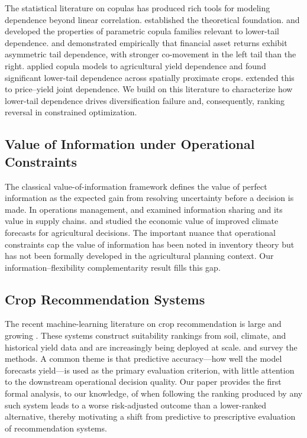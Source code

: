 \documentclass[12pt,review,authoryear]{elsarticle}
\numberwithin{equation}{section}
\begin{document}
The statistical literature on copulas has produced rich tools for modeling
dependence beyond linear correlation.  \citet{Sklar1959} established the
theoretical foundation.  \citet{Joe1997} and \citet{Nelsen2006} developed
the properties of parametric copula families relevant to lower-tail
dependence.  \citet{Longin2001} and \citet{Ang2002} demonstrated
empirically that financial asset returns exhibit asymmetric tail
dependence, with stronger co-movement in the left tail than the right.
\citet{Zhu2011} applied copula models to agricultural yield dependence
and found significant lower-tail dependence across spatially proximate
crops.  \citet{Barnhill2022} extended this to price--yield joint
dependence.  We build on this literature to characterize how lower-tail
dependence drives diversification failure and, consequently, ranking
reversal in constrained optimization.

\subsection*{Value of Information under Operational Constraints}

The classical value-of-information framework \citep{Raiffa1961,Lawrence1999}
defines the value of perfect information as the expected gain from
resolving uncertainty before a decision is made.  In operations
management, \citet{Cachon2007} and \citet{Vives1999} examined information
sharing and its value in supply chains.  \citet{Kuwayama2019} and
\citet{Lobell2009} studied the economic value of improved climate
forecasts for agricultural decisions.  The important nuance that
operational constraints cap the value of information has been noted in
inventory theory \citep{Gaur2005} but has not been formally developed in
the agricultural planning context.  Our information--flexibility
complementarity result fills this gap.

\subsection*{Crop Recommendation Systems}

The recent machine-learning literature on crop recommendation is large
and growing \citep{Kamilaris2018,vanKlompenburg2020,Liakos2018}.
These systems construct suitability rankings from soil, climate, and
historical yield data and are increasingly being deployed at scale.
\citet{Mucherino2009} and \citet{Pantazi2016} survey the methods.
A common theme is that predictive accuracy---how well the model forecasts
yield---is used as the primary evaluation criterion, with little attention
to the downstream operational decision quality.  Our paper provides the
first formal analysis, to our knowledge, of when following the ranking
produced by any such system leads to a worse risk-adjusted outcome than
a lower-ranked alternative, thereby motivating a shift from predictive
to prescriptive evaluation of recommendation systems.
\end{document}
